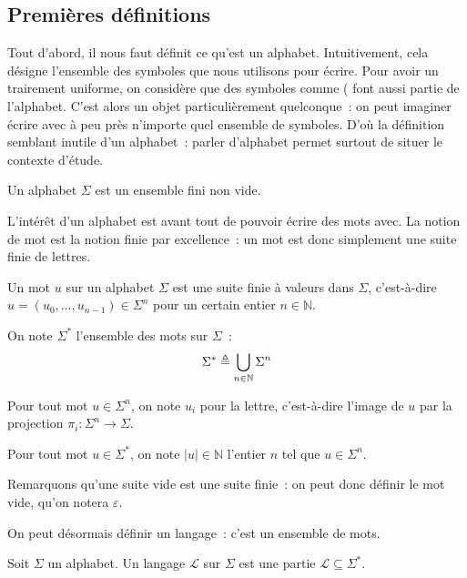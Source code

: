 \subsection{Premières définitions}

Tout d'abord, il nous faut définit ce qu'est un alphabet. Intuitivement, cela
désigne l'ensemble des symboles que nous utilisons pour écrire. Pour avoir un
trairement uniforme, on considère que des symboles comme \og ( \fg font aussi
partie de l'alphabet. C'est alors un objet particulièrement quelconque~: on peut
imaginer écrire avec à peu près n'importe quel ensemble de symboles. D'où la
définition semblant inutile d'un alphabet~: parler d'alphabet permet surtout de
situer le contexte d'étude.

\begin{definition}[Alphabet]
  Un alphabet $\Sigma$ est un ensemble fini non vide.
\end{definition}

L'intérêt d'un alphabet est avant tout de pouvoir écrire des mots avec. La
notion de mot est la notion finie par excellence~: un mot est donc simplement
une suite finie de lettres.

\begin{definition}[Mot]
  Un mot $u$ sur un alphabet $\Sigma$ est une suite finie à valeurs dans
  $\Sigma$, c'est-à-dire
  $u = (u_0,\ldots,u_{n-1})\in \Sigma^n$ pour un certain entier $n\in\mathbb N$.

  On note $\Sigma^*$ l'ensemble des mots sur $\Sigma$~:
  \[\Sigma^* \triangleq \bigcup_{n\in \mathbb N} \Sigma^n\]
\end{definition}

\begin{notation}
  Pour tout mot $u\in\Sigma^n$, on note $u_i$ pour la
   lettre, c'est-à-dire l'image de $u$ par la
  projection $\pi_i : \Sigma^n \to \Sigma$.

  Pour tout mot $u\in\Sigma^*$, on note $|u|\in\mathbb N$ l'entier $n$ tel que
  $u\in \Sigma^n$.
\end{notation}

Remarquons qu'une suite vide est une suite finie~: on peut donc définir le mot
vide, qu'on notera $\varepsilon$.

On peut désormais définir un langage~: c'est un ensemble de mots.

\begin{definition}[Langage]
  Soit $\Sigma$ un alphabet. Un langage $\mathcal L$ sur $\Sigma$ est une partie
  $\mathcal L\subseteq\Sigma^*$.
\end{definition}

